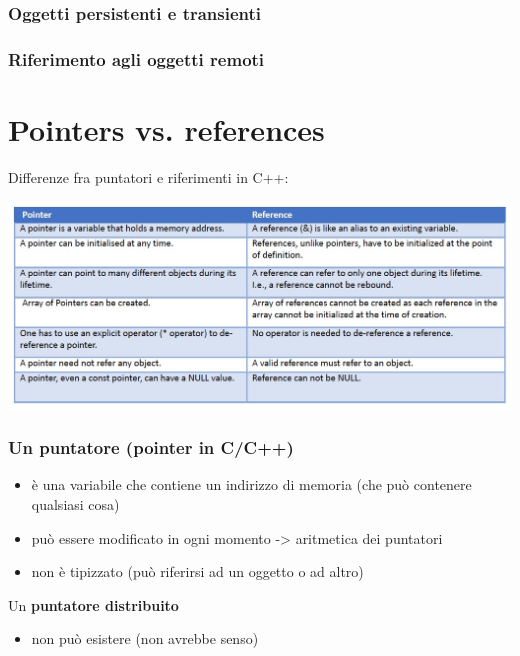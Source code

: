 \subsubsection{Oggetti persistenti e transienti}
\subsubsection{Riferimento agli oggetti remoti}

\section{Pointers vs. references}
Differenze fra puntatori e riferimenti in C++:
\begin{center}
    \includegraphics[scale=0.5]{img/DO_pointersreferences1.jpg}
\end{center}
\subsubsection{Un puntatore (pointer in C/C++)}
\begin{itemize}
    \item è una variabile che contiene un indirizzo di memoria (che può contenere qualsiasi cosa)
    \item può essere modificato in ogni momento -> aritmetica dei puntatori
    \item non è tipizzato (può riferirsi ad un oggetto o ad altro)
\end{itemize}
Un \textbf{puntatore distribuito}
\begin{itemize}
    \item non può esistere (non avrebbe senso)
\end{itemize}
